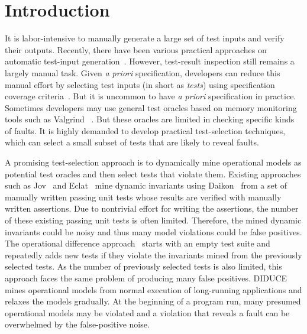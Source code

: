 \documentclass{sig-alternate}
\begin{document}
%
%

\section{Introduction} \label{sec:intro}

It is labor-intensive to manually generate a large set of test
inputs and verify their outputs. Recently, there have been various
practical approaches on automatic test-input
generation~\cite{Pacheco07, Sen05, Visser04}. However, test-result
inspection still remains a largely manual task. Given \emph{a
priori} specification, developers can reduce this manual effort by
selecting test inputs (in short as \emph{tests}) using specification
coverage criteria~\cite{Chang99}. But it is uncommon to have \emph{a
priori} specification in practice. Sometimes developers may use
general test oracles based on memory monitoring tools such as
Valgrind ~\cite{Nethercote07}. But these oracles are limited in
checking specific kinds of faults. It is highly demanded to develop
practical test-selection techniques, which can select a small subset
of tests that are likely to reveal faults.


A promising test-selection approach is to dynamically mine
operational models as potential test oracles and then select tests
that violate them. Existing approaches such as Jov~\cite{Xie03} and
Eclat~\cite{Pacheco05} mine dynamic invariants using
Daikon~\cite{Ernst01} from a set of manually written passing unit
tests whose results are verified with manually written assertions.
Due to nontrivial effort for writing the assertions, the number of
these existing passing unit tests is often limited. Therefore, the
mined dynamic invariants could be noisy and thus many model
violations could be false positives. The operational difference
approach~\cite{Harder03} starts with an empty test suite and
repeatedly adds new tests if they violate the invariants mined from
the previously selected tests. As the number of previously selected
tests is also limited, this approach faces the same problem of
producing many false positives. DIDUCE~\cite{Hangal02} mines
operational models from normal execution of long-running
applications and relaxes the models gradually. At the beginning of a
program run, many presumed operational models may be violated and a
violation that reveals a fault can be overwhelmed by the
false-positive noise.
\end{document}
